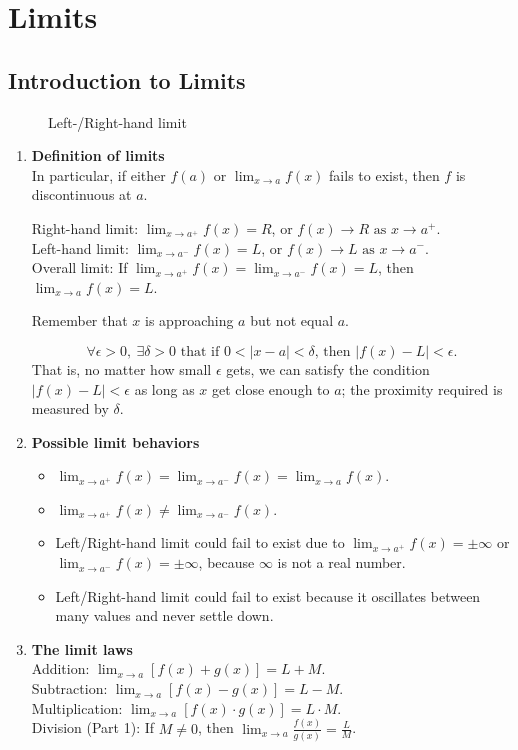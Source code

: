 \chapter{Limits}
\section{Introduction to Limits}
\begin{figure}[H]
  \centering
  \caption{Left-/Right-hand limit}
\end{figure}
\begin{enumerate}
  \item \textbf{Definition of limits}\\
    \indent In particular, if either \(f(a)\) or \(\lim_{x\to a} f(x)\) fails to exist, then \(f\) is discontinuous at \(a\).\par
    \indent Right-hand limit: \(\lim_{x\to a^+}f(x)=R\), or \(f(x)\to R\text{ as }x\to a^+\).\\
    \indent Left-hand limit: \(\lim_{x\to a^-}f(x)=L\), or \(f(x)\to L\text{ as }x\to a^-\).\\
    \indent Overall limit: If \(\lim_{x\to a^+}f(x)=\lim_{x\to a^-}f(x)=L\), then \(\lim_{x\to a}f(x)=L\).\par
    Remember that \(x\) is approaching \(a\) but not equal \(a\).
    \begin{definition}
    \[
      \forall\epsilon>0,\ \exists\delta>0\text{ that if }0<\lvert x-a\rvert<\delta\text{, then }\lvert f(x)-L\rvert<\epsilon.
    \]
    That is, no matter how small \(\epsilon\) gets, we can satisfy the condition \(\lvert f(x)-L\rvert<\epsilon\) as long as \(x\) get close enough to \(a\); the proximity required is measured by \(\delta\).
    \end{definition}
  \item \textbf{Possible limit behaviors}
    \begin{itemize}
      \item \(\lim_{x\to a^+}f(x)=\lim_{x\to a^-}f(x)=\lim_{x\to a}f(x)\).
      \item \(\lim_{x\to a^+}f(x)\neq\lim_{x\to a^-}f(x)\).
      \item Left\slash Right-hand limit could fail to exist due to \(\lim_{x\to a^+}f(x)=\pm\infty\) or \(\lim_{x\to a^-}f(x)=\pm\infty\), because \(\infty\) is not a real number.
      \item Left\slash Right-hand limit could fail to exist because it oscillates between many values and never settle down.
    \end{itemize}
  \item \textbf{The limit laws}\\
    \indent Addition: \(\lim_{x\to a}[f(x)+g(x)]=L+M\).\\
    \indent Subtraction: \(\lim_{x\to a}[f(x)-g(x)]=L-M.\)\\
    \indent Multiplication: \(\lim_{x\to a}[f(x)\cdot g(x)]=L\cdot M\).\\
    \indent Division (Part 1): If \(M\neq 0\), then \(\lim_{x\to a}\frac{f(x)}{g(x)}=\frac{L}{M}\).
\end{enumerate}

